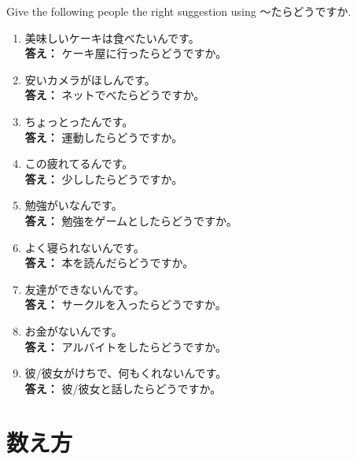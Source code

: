 \documentclass[notoc,notitlepage]{tufte-book}
\begin{document}
\begin{ex}
  Give the following people the right suggestion using 〜たらどうですか.
  \begin{enumerate}
    \item 美味しいケーキは食べたいんです。\\
      \textbf{答え：} ケーキ屋に行ったらどうですか。
    \item 安いカメラがほしんです。\\
      \textbf{答え：} ネットでべたらどうですか。
    \item ちょっとったんです。\\
      \textbf{答え：} 運動したらどうですか。
    \item この疲れてるんです。\\
      \textbf{答え：} 少ししたらどうですか。
    \item 勉強がいなんです。\\
      \textbf{答え：} 勉強をゲームとしたらどうですか。
    \item よく寝られないんです。\\
      \textbf{答え：} 本を読んだらどうですか。
    \item 友達ができないんです。\\
      \textbf{答え：} サークルを入ったらどうですか。
    \item お金がないんです。\\
      \textbf{答え：} アルバイトをしたらどうですか。
    \item 彼/彼女がけちで、何もくれないんです。\\
      \textbf{答え：} 彼/彼女と話したらどうですか。
  \end{enumerate}
\end{ex}


\section{数え方}%
\label{sec:shu_efang_}
\end{document}
